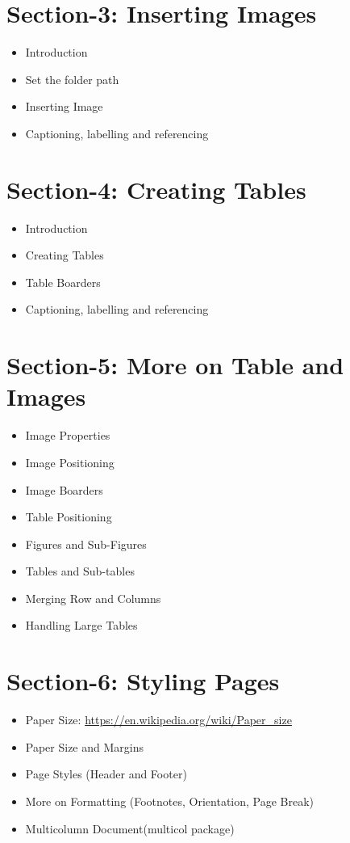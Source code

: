\documentclass[a4paper, 12pt]{article}
\begin{document}
\section*{Section-3: Inserting Images} 
\begin{itemize}
	\item Introduction 
	\item Set the folder path 
	\item Inserting Image 
	\item Captioning, labelling and referencing
\end{itemize}


\section*{Section-4: Creating Tables} 
\begin{itemize}
	\item Introduction 
	\item Creating Tables 
	\item Table Boarders  
	\item Captioning, labelling and referencing
\end{itemize}

\section*{Section-5: More on Table and Images} 
\begin{itemize}
	\item Image Properties 
	\item Image Positioning
	\item Image Boarders 
	\item Table Positioning
	\item Figures and Sub-Figures 
	\item Tables and Sub-tables 
	\item Merging Row and Columns 
	\item Handling Large Tables 
\end{itemize}

 
\section*{Section-6: Styling Pages} 
\begin{itemize}
	\item Paper Size: \url{https://en.wikipedia.org/wiki/Paper_size}
	\item Paper Size and Margins  
	\item Page Styles (Header and Footer)
	\item More on Formatting (Footnotes, Orientation, Page Break) 
	\item Multicolumn Document(multicol package)
\end{itemize}
\end{document}
